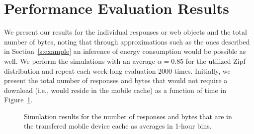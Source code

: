 \documentclass[letterpaper,journal,onecolumn,draftcls]{IEEEtran}
\begin{document}
\section{Performance Evaluation Results}
\label{s:results}
We present our results for the individual responses or web objects and the total number of bytes, noting that through approximations such as the ones described in Section~\ref{s:example} an inference of energy consumption would be possible as well.
We perform the simulations with an average $\alpha=0.85$ for the utilized Zipf distribution and repeat each week-long evaluation 2000 times.
Initially, we present the total number of responses and bytes that would not require a download (i.e., would reside in the mobile cache) as a function of time in Figure~\ref{fig:sim1}.
\begin{figure}[h!]
	\centering
	\qquad
	\caption{Simulation results for the number of responses and bytes that are in the transfered mobile device cache as averages in 1-hour bins.}
	\label{fig:sim1}
\end{figure}
\end{document}

